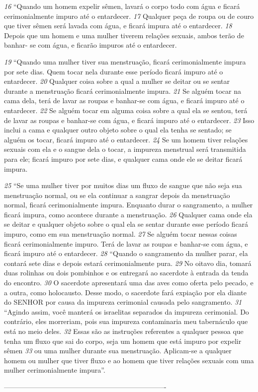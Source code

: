 \bigskip
\textit{\tiny 16}
“Quando um homem expelir sêmen, lavará o corpo todo com água e ficará
cerimonialmente impuro até o entardecer. 
\textit{\tiny 17}
Qualquer peça de roupa ou de couro
que tiver sêmen será lavada com água, e ficará impura até o entardecer. 
\textit{\tiny 18}
Depois
que um homem e uma mulher tiverem relações sexuais, ambos terão de banhar-
se com água, e ficarão impuros até o entardecer.
   
\bigskip
\textit{\tiny 19}
“Quando uma mulher tiver sua menstruação, ficará cerimonialmente impura
por sete dias. Quem tocar nela durante esse período ficará impuro até o
entardecer. 
\textit{\tiny 20}
Qualquer coisa sobre a qual a mulher se deitar ou se sentar durante
a menstruação ficará cerimonialmente impura. 
\textit{\tiny 21}
Se alguém tocar na cama dela,
terá de lavar as roupas e banhar-se com água, e ficará impuro até o entardecer.
\textit{\tiny 22}
Se alguém tocar em alguma coisa sobre a qual ela se sentou, terá de lavar as
roupas e banhar-se com água, e ficará impuro até o entardecer. 
\textit{\tiny 23}
Isso inclui a
cama e qualquer outro objeto sobre o qual ela tenha se sentado; se alguém os
tocar, ficará impuro até o entardecer. 
\textit{\tiny 24}
Se um homem tiver relações sexuais com
ela e o sangue dela o tocar, a impureza menstrual será transmitida para ele; ficará
impuro por sete dias, e qualquer cama onde ele se deitar ficará impura.
   
\bigskip
\textit{\tiny 25}
“Se uma mulher tiver por muitos dias um fluxo de sangue que não seja sua
menstruação normal, ou se ela continuar a sangrar depois da menstruação
normal, ficará cerimonialmente impura. Enquanto durar o sangramento, a mulher
ficará impura, como acontece durante a menstruação. 
\textit{\tiny 26}
Qualquer cama onde ela
se deitar e qualquer objeto sobre o qual ela se sentar durante esse período ficará
impuro, como em sua menstruação normal. 
\textit{\tiny 27}
Se alguém tocar nessas coisas
ficará cerimonialmente impuro. Terá de lavar as roupas e banhar-se com água, e
ficará impuro até o entardecer.
\textit{\tiny 28}
“Quando o sangramento da mulher parar, ela contará sete dias e depois
estará cerimonialmente pura. 
\textit{\tiny 29}
No oitavo dia, tomará duas rolinhas ou dois
pombinhos e os entregará ao sacerdote à entrada da tenda do encontro. 
\textit{\tiny 30}
O
sacerdote apresentará uma das aves como oferta pelo pecado, e a outra, como
holocausto. Desse modo, o sacerdote fará expiação por ela diante do SENHOR por
causa da impureza cerimonial causada pelo sangramento.
\textit{\tiny 31}
“Agindo assim, você manterá os israelitas separados da impureza cerimonial.
Do contrário, eles morreriam, pois sua impureza contaminaria meu tabernáculo
que está no meio deles. 
\textit{\tiny 32}
Essas são as instruções referentes a qualquer pessoa
que tenha um fluxo que sai do corpo, seja um homem que está impuro por expelir
sêmen 
\textit{\tiny 33}
ou uma mulher durante sua menstruação. Aplicam-se a qualquer
homem ou mulher que tiver fluxo e ao homem que tiver relações sexuais com
uma mulher cerimonialmente impura”.

----------------------------------------------------------------------
